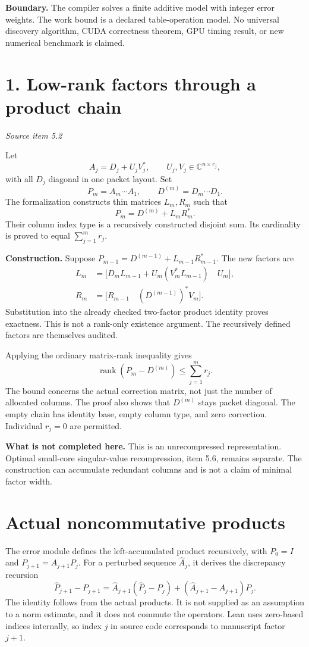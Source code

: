 \documentclass[11pt]{article}
\newcommand{\pageheading}[2]{\section*{\color{ink}#1}\textit{#2}\par}
\begin{document}
\textbf{Boundary.} The compiler solves a finite additive model with integer error weights. The work bound is a declared table-operation model. No universal discovery algorithm, CUDA correctness theorem, GPU timing result, or new numerical benchmark is claimed.

\newpage
\pageheading{1. Low-rank factors through a product chain}{Source item 5.2}
Let
\[
A_j=D_j+U_jV_j^*,\qquad U_j,V_j\in\mathbb C^{n\times r_j},
\]
with all $D_j$ diagonal in one packet layout. Set
\[
P_m=A_m\cdots A_1,\qquad D^{(m)}=D_m\cdots D_1.
\]
The formalization constructs thin matrices $L_m,R_m$ such that
\[
\boxed{P_m=D^{(m)}+L_mR_m^*.}
\]
Their column index type is a recursively constructed disjoint sum. Its cardinality is proved to equal $\sum_{j=1}^m r_j$.

\textbf{Construction.} Suppose $P_{m-1}=D^{(m-1)}+L_{m-1}R_{m-1}^*$. The new factors are
\begin{align*}
L_m&=\bigl[D_mL_{m-1}+U_m(V_m^*L_{m-1})\quad U_m\bigr],\\
R_m&=\bigl[R_{m-1}\quad (D^{(m-1)})^*V_m\bigr].
\end{align*}
Substitution into the already checked two-factor product identity proves exactness. This is not a rank-only existence argument. The recursively defined factors are themselves audited.

Applying the ordinary matrix-rank inequality gives
\[
\boxed{\operatorname{rank}(P_m-D^{(m)})\leq\sum_{j=1}^m r_j.}
\]
The bound concerns the actual correction matrix, not just the number of allocated columns. The proof also shows that $D^{(m)}$ stays packet diagonal. The empty chain has identity base, empty column type, and zero correction. Individual $r_j=0$ are permitted.

\textbf{What is not completed here.} This is an unrecompressed representation. Optimal small-core singular-value recompression, item 5.6, remains separate. The construction can accumulate redundant columns and is not a claim of minimal factor width.

\section*{\color{ink}Actual noncommutative products}
The error module defines the left-accumulated product recursively, with $P_0=I$ and $P_{j+1}=A_{j+1}P_j$. For a perturbed sequence $\widehat A_j$, it derives the discrepancy recursion
\[
\widehat P_{j+1}-P_{j+1}
=\widehat A_{j+1}(\widehat P_j-P_j)
 +(\widehat A_{j+1}-A_{j+1})P_j.
\]
The identity follows from the actual products. It is not supplied as an assumption to a norm estimate, and it does not commute the operators. Lean uses zero-based indices internally, so index $j$ in source code corresponds to manuscript factor $j+1$.
\end{document}
